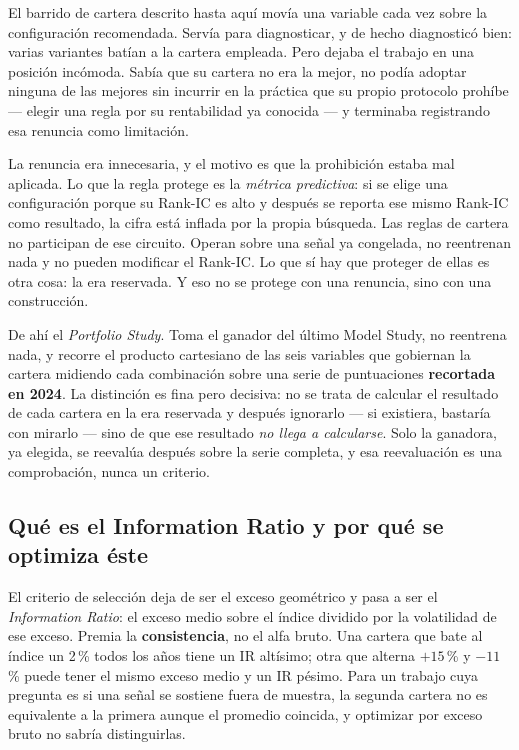 El barrido de cartera descrito hasta aquí movía una variable cada vez sobre la configuración
recomendada. Servía para diagnosticar, y de hecho diagnosticó bien: varias variantes batían a la
cartera empleada. Pero dejaba el trabajo en una posición incómoda. Sabía que su cartera no era la
mejor, no podía adoptar ninguna de las mejores sin incurrir en la práctica que su propio protocolo
prohíbe --- elegir una regla por su rentabilidad ya conocida --- y terminaba registrando esa
renuncia como limitación.

La renuncia era innecesaria, y el motivo es que la prohibición estaba mal aplicada. Lo que la regla
protege es la \emph{métrica predictiva}: si se elige una configuración porque su Rank-IC es alto y
después se reporta ese mismo Rank-IC como resultado, la cifra está inflada por la propia búsqueda.
Las reglas de cartera no participan de ese circuito. Operan sobre una señal ya congelada, no
reentrenan nada y no pueden modificar el Rank-IC. Lo que sí hay que proteger de ellas es otra cosa:
la era reservada. Y eso no se protege con una renuncia, sino con una construcción.

De ahí el \emph{Portfolio Study}. Toma el ganador del último Model Study, no reentrena nada, y
recorre el producto cartesiano de las seis variables que gobiernan la cartera midiendo cada
combinación sobre una serie de puntuaciones \textbf{recortada en 2024}. La distinción es fina pero
decisiva: no se trata de calcular el resultado de cada cartera en la era reservada y después
ignorarlo --- si existiera, bastaría con mirarlo --- sino de que ese resultado \emph{no llega a
calcularse}. Solo la ganadora, ya elegida, se reevalúa después sobre la serie completa, y esa
reevaluación es una comprobación, nunca un criterio.

\subsection*{Qué es el Information Ratio y por qué se optimiza éste}

El criterio de selección deja de ser el exceso geométrico y pasa a ser el \emph{Information Ratio}:
el exceso medio sobre el índice dividido por la volatilidad de ese exceso. Premia la
\textbf{consistencia}, no el alfa bruto. Una cartera que bate al índice un 2\,\% todos los años
tiene un IR altísimo; otra que alterna $+15$\,\% y $-11$\,\% puede tener el mismo exceso medio y un
IR pésimo. Para un trabajo cuya pregunta es si una señal se sostiene fuera de muestra, la segunda
cartera no es equivalente a la primera aunque el promedio coincida, y optimizar por exceso bruto no
sabría distinguirlas.

